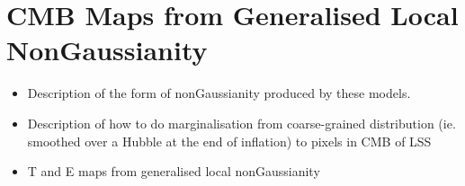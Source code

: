 \section{CMB Maps from Generalised Local NonGaussianity}
\begin{itemize}
\item Description of the form of nonGaussianity produced by these models.
\item Description of how to do marginalisation from coarse-grained distribution (ie. smoothed over a Hubble at the end of inflation) to pixels in CMB of LSS
\item T and E maps from generalised local nonGaussianity
\end{itemize}
